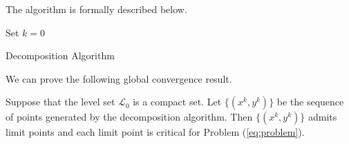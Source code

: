 The algorithm is formally described below.

\begin{algorithm}[ht]
 Set $k = 0$\\
 \caption{Decomposition Algorithm}
\end{algorithm}
\par\bigskip\noindent
We can prove the following global convergence result.
\begin{proposition}\label{prop:conv1}
Suppose that the level set $\mathcal{L}_0$ is a compact set. Let $\{(x^k, y^k)\}$ be the sequence of points generated by the decomposition algorithm. Then
$\{(x^k, y^k)\}$ admits limit points and each limit point is critical for Problem (\ref{eq:problem}).
\end{proposition}

